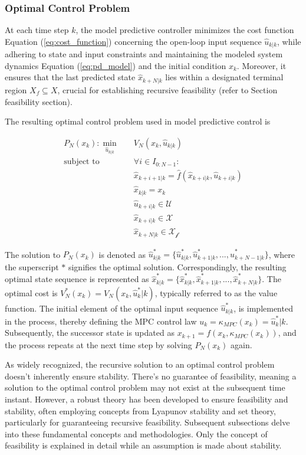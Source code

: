 \subsubsection{Optimal Control Problem } \label{sec:ocp}
At each time step $k$, the model predictive controller  minimizes the cost function Equation (\ref{eq:cost_function}) concerning the open-loop input sequence $\hat{u}_{k|k}$, while adhering to state and input constraints and maintaining the modeled system dynamics Equation (\ref{eq:pd_model}) and the initial condition $x_k$. Moreover, it ensures that the last predicted state $\hat{x}_{k+N|k}$ lies within a designated terminal region $X_f \subseteq X$, crucial for establishing recursive feasibility (refer to Section feasibility section).

The resulting optimal control problem used in model predictive control is


\begin{equation}\label{eq:ocp_general}
\begin{aligned}
    {P}_N(x_k) : \min_{\hat{u}_{k|k}}\quad & V_N(x_k,\hat{u}_{k|k}) \\
\text{subject to} \quad & \forall i \in I_{0:N-1} : \\
& \hat{x}_{k+i+1|k} = \hat{f}(\hat{x}_{k+i|k}, \hat{u}_{k+i|k}) \\
& \hat{x}_{k|k} = x_k \\
& \hat{u}_{k+i|k} \in \mathcal{U} \\
& \hat{x}_{k+i|k} \in \mathcal{X} \\
& \hat{x}_{k+N|k} \in \mathcal{X_f}
\end{aligned}
\end{equation}

The solution to $P_N(x_k)$ is denoted as $\hat{u}^*_{k|k} = \{\hat{u}^*_{k|k}, \hat{u}^*_{k+1|k}, ..., \hat{u}^*_{k+N-1|k}\}$, where the superscript $*$ signifies the optimal solution. Correspondingly, the resulting optimal state sequence is represented as $\hat{x}^*_{k|k} = \{\hat{x}^*_{k|k}, \hat{x}^*_{k+1|k}, ..., \hat{x}^*_{k+N|k}\}$. The optimal cost is $V^*_N(x_k) = V_N(x_k, \hat{u}^*_k|k)$, typically referred to as the value function. The initial element of the optimal input sequence $\hat{u}^*_{k|k}$, is implemented in the process, thereby defining the MPC control law $u_k = \kappa_{MPC}(x_k) = \hat{u}^*_k|k$. Subsequently, the successor state is updated as $x_{k+1} = f(x_k, \kappa_{MPC}(x_k))$, and the process repeats at the next time step by solving $P_N(x_k)$ again.

As widely recognized, the recursive solution to an optimal control problem doesn't inherently ensure stability. There's no guarantee of feasibility, meaning a solution to the optimal control problem may not exist at the subsequent time instant. However, a robust theory has been developed to ensure feasibility and stability, often employing concepts from Lyapunov stability and set theory, particularly for guaranteeing recursive feasibility. Subsequent subsections delve into these fundamental concepts and methodologies. Only the concept of feasibility is explained in detail while an assumption is made about stability. 


